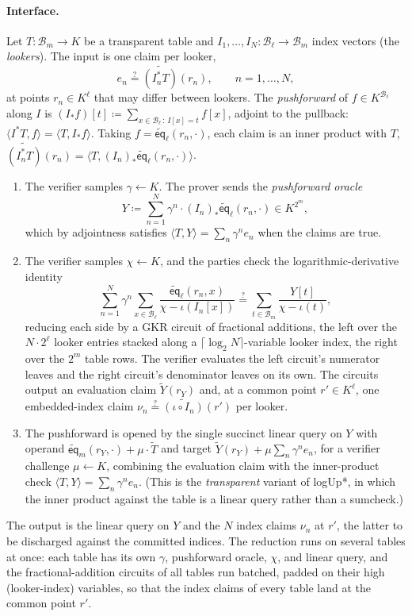 \documentclass{article}
\theoremstyle{definition}
\newcommand*{\mle}{\widetilde}
\newcommand{\eq}{\mathsf{eq}}
\newcommand{\BB}{\mathcal{B}}
\begin{document}
\paragraph{Interface.}
Let $T \colon \BB_m \to K$ be a transparent table and $I_1, \ldots, I_N \colon \BB_\ell \to \BB_m$ index vectors (the \emph{lookers}). The input is one claim per looker,
\[
  e_n \stackrel{?}{=} \mle{(I_n^* T)}(r_n), \qquad n = 1, \ldots, N,
\]
at points $r_n \in K^\ell$ that may differ between lookers. The \emph{pushforward} of $f \in K^{\BB_\ell}$ along $I$ is $(I_* f)[t] \coloneqq \sum_{x \in \BB_\ell \,:\, I[x] = t} f[x]$, adjoint to the pullback: $\langle I^* T, f \rangle = \langle T, I_* f \rangle$. Taking $f = \mle{\eq}_\ell(r_n, \cdot)$, each claim is an inner product with $T$, $\mle{(I_n^* T)}(r_n) = \langle T, (I_n)_* \mle{\eq}_\ell(r_n, \cdot) \rangle$.
\begin{enumerate}
\item The verifier samples $\gamma \gets K$. The prover sends the \emph{pushforward oracle}
\[
  Y \coloneqq \sum_{n = 1}^{N} \gamma^n \cdot (I_n)_* \mle{\eq}_\ell(r_n, \cdot) \in K^{2^m},
\]
which by adjointness satisfies $\langle T, Y \rangle = \sum_n \gamma^n e_n$ when the claims are true.
\item The verifier samples $\chi \gets K$, and the parties check the logarithmic-derivative identity
\[
  \sum_{n = 1}^{N} \gamma^n \sum_{x \in \BB_\ell} \frac{\mle{\eq}_\ell(r_n, x)}{\chi - \iota(I_n[x])} \stackrel{?}{=} \sum_{t \in \BB_m} \frac{Y[t]}{\chi - \iota(t)},
\]
reducing each side by a GKR circuit of fractional additions, the left over the $N \cdot 2^\ell$ looker entries stacked along a $\lceil \log_2 N \rceil$-variable looker index, the right over the $2^m$ table rows. The verifier evaluates the left circuit's numerator leaves and the right circuit's denominator leaves on its own. The circuits output an evaluation claim $\mle{Y}(r_Y)$ and, at a common point $r' \in K^\ell$, one embedded-index claim $\nu_n \stackrel{?}{=} \mle{(\iota \circ I_n)}(r')$ per looker.
\item The pushforward is opened by the single succinct linear query on $Y$ with operand $\mle{\eq}_m(r_Y, \cdot) + \mu \cdot \mle{T}$ and target $\mle{Y}(r_Y) + \mu \sum_n \gamma^n e_n$, for a verifier challenge $\mu \gets K$, combining the evaluation claim with the inner-product check $\langle T, Y \rangle = \sum_n \gamma^n e_n$. (This is the \emph{transparent} variant of logUp*, in which the inner product against the table is a linear query rather than a sumcheck.)
\end{enumerate}
The output is the linear query on $Y$ and the $N$ index claims $\nu_n$ at $r'$, the latter to be discharged against the committed indices. The reduction runs on several tables at once: each table has its own $\gamma$, pushforward oracle, $\chi$, and linear query, and the fractional-addition circuits of all tables run batched, padded on their high (looker-index) variables, so that the index claims of every table land at the common point $r'$.
\end{document}
